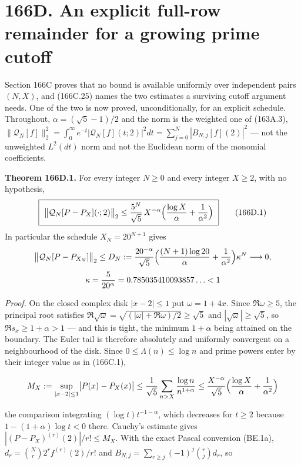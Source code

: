 \documentclass[
  11pt,
]{book}
\renewenvironment{quote}
  {\begin{tcolorbox}[
      enhanced,
      breakable,
      colback=tncream,
      colframe=tnrust,
      boxrule=0.8pt,
      arc=1.5pt,
      left=7pt,
      right=7pt,
      top=6pt,
      bottom=6pt]}
  {\end{tcolorbox}}
\begin{document}
\section{166D. An explicit full-row remainder for a growing prime
cutoff}\label{d.-an-explicit-full-row-remainder-for-a-growing-prime-cutoff}

Section 166C proves that no bound is available uniformly over
independent pairs \((N,X)\), and (166C.25) names the two estimates a
surviving cutoff argument needs. One of the two is now proved,
unconditionally, for an explicit schedule. Throughout,
\(\alpha=(\sqrt5-1)/2\) and the norm is the weighted one of (163A.3),
\(\lVert\mathcal Q_N[f]\rVert_2^2=\int_0^\infty e^{-t}|\mathcal Q_N[f](t;2)|^2dt
=\sum_{j=0}^N|B_{N,j}[f](2)|^2\) --- not the unweighted \(L^2(dt)\) norm
and not the Euclidean norm of the monomial coefficients.

\begin{quote}
\textbf{Theorem 166D.1.} For every integer \(N\ge0\) and every integer
\(X\ge2\), with no hypothesis, \[
\boxed{\ \bigl\lVert\mathcal Q_N[P-P_X](\cdot;2)\bigr\rVert_2
\le\frac{5^N}{\sqrt5}\,X^{-\alpha}
\Bigl(\frac{\log X}{\alpha}+\frac1{\alpha^2}\Bigr)\ }
\tag{166D.1}
\] In particular the schedule \(X_N=20^{N+1}\) gives \[
\begin{gathered}
\bigl\lVert\mathcal Q_N[P-P_{X_N}]\bigr\rVert_2\le D_N
:=\frac{20^{-\alpha}}{\sqrt5}
\Bigl(\frac{(N+1)\log20}{\alpha}+\frac1{\alpha^2}\Bigr)\kappa^N
\longrightarrow0,\\[2pt]
\kappa=\frac5{20^\alpha}=0.785035410093857\ldots<1
\end{gathered}
\]
\end{quote}

\emph{Proof.} On the closed complex disk \(|x-2|\le1\) put
\(\omega=1+4x\). Since \(\Re\omega\ge5\), the principal root satisfies
\(\Re\sqrt\omega=\sqrt{(|\omega|+\Re\omega)/2}\ge\sqrt5\) and
\(|\sqrt\omega|\ge\sqrt5\), so \(\Re s_x\ge1+\alpha>1\) --- and this is
tight, the minimum \(1+\alpha\) being attained on the boundary. The
Euler tail is therefore absolutely and uniformly convergent on a
neighbourhood of the disk. Since \(0\le\Lambda(n)\le\log n\) and prime
powers enter by their integer value as in (166C.1),

\[
M_X:=\sup_{|x-2|\le1}\bigl|P(x)-P_X(x)\bigr|
\le\frac1{\sqrt5}\sum_{n>X}\frac{\log n}{n^{1+\alpha}}
\le\frac{X^{-\alpha}}{\sqrt5}\Bigl(\frac{\log X}\alpha+\frac1{\alpha^2}\Bigr)
\]

the comparison integrating \((\log t)t^{-1-\alpha}\), which decreases
for \(t\ge2\) because \(1-(1+\alpha)\log t<0\) there. Cauchy's estimate
gives \(|(P-P_X)^{(r)}(2)|/r!\le M_X\). With the exact Pascal conversion
(BE.1a), \(d_r=\binom Nr2^rf^{(r)}(2)/r!\) and
\(B_{N,j}=\sum_{r\ge j}(-1)^j\binom rjd_r\), so
\end{document}
